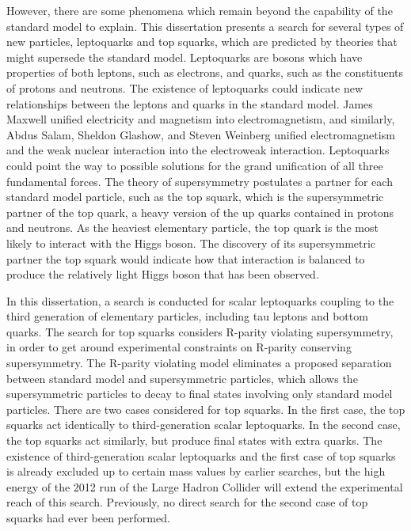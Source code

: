 However, there are some phenomena which remain beyond the capability of the standard model to explain. This dissertation presents a search for several types of new particles, leptoquarks and top squarks, which are predicted by theories that might supersede the standard model. Leptoquarks are bosons which have properties of both leptons, such as electrons, and quarks, such as the constituents of protons and neutrons. The existence of leptoquarks could indicate new relationships between the leptons and quarks in the standard model. James Maxwell unified electricity and magnetism into electromagnetism, and similarly, Abdus Salam, Sheldon Glashow, and Steven Weinberg unified electromagnetism and the weak nuclear interaction into the electroweak interaction. Leptoquarks could point the way to possible solutions for the grand unification of all three fundamental forces. The theory of supersymmetry postulates a partner for each standard model particle, such as the top squark, which is the supersymmetric partner of the top quark, a heavy version of the up quarks contained in protons and neutrons. As the heaviest elementary particle, the top quark is the most likely to interact with the Higgs boson. The discovery of its supersymmetric partner the top squark would indicate how that interaction is balanced to produce the relatively light Higgs boson that has been observed.

In this dissertation, a search is conducted for scalar leptoquarks coupling to the third generation of elementary particles, including tau leptons and bottom quarks. The search for top squarks considers R-parity violating supersymmetry, in order to get around experimental constraints on R-parity conserving supersymmetry. The R-parity violating model eliminates a proposed separation between standard model and supersymmetric particles, which allows the supersymmetric particles to decay to final states involving only standard model particles. There are two cases considered for top squarks. In the first case, the top squarks act identically to third-generation scalar leptoquarks. In the second case, the top squarks act similarly, but produce final states with extra quarks. The existence of third-generation scalar leptoquarks and the first case of top squarks is already excluded up to certain mass values by earlier searches, but the high energy of the 2012 run of the Large Hadron Collider will extend the experimental reach of this search. Previously, no direct search for the second case of top squarks had ever been performed.